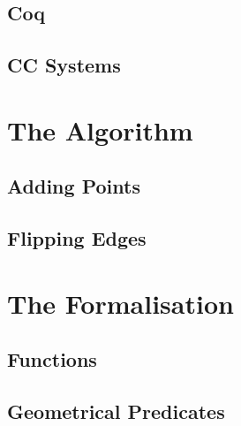 \documentclass[handout]{beamer}
\begin{document}
\subsection{{\sc Coq}}

\begin{frame}
 
\end{frame}


\subsection{CC Systems}

\begin{frame}
 
\end{frame}


\section{The Algorithm}

\subsection{Adding Points}

\begin{frame}
 
\end{frame}


\subsection{Flipping Edges}

\begin{frame}
 
\end{frame}


\section{The Formalisation}

\subsection{Functions}

\begin{frame}
 
\end{frame}

\subsection{Geometrical Predicates}
\end{document}
